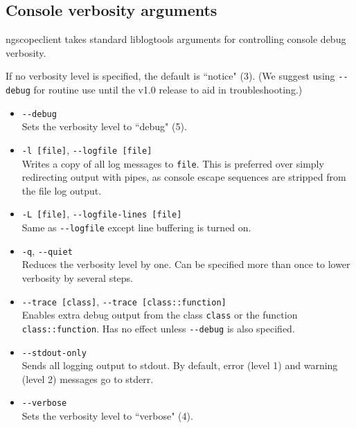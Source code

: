 \subsection{Console verbosity arguments}

ngscopeclient takes standard liblogtools arguments for controlling console debug verbosity.

If no verbosity level is specified, the default is ``notice" (3). (We suggest using \texttt{-{}-debug} for routine use
until the v1.0 release to aid in troubleshooting.)

\begin{itemize}

\item \texttt{-{}-debug}\\
Sets the verbosity level to ``debug" (5).

\item \texttt{-l [file]}, \texttt{-{}-logfile [file]}\\
Writes a copy of all log messages to \texttt{file}. This is preferred over simply redirecting output with pipes, as
console escape sequences are stripped from the file log output.

\item \texttt{-L [file]}, \texttt{-{}-logfile-lines [file]}\\
Same as \texttt{-{}-logfile} except line buffering is turned on.

\item \texttt{-q}, \texttt{-{}-quiet}\\
Reduces the verbosity level by one. Can be specified more than once to lower verbosity by several steps.

\item \texttt{-{}-trace [class]}, \texttt{-{}-trace [class::function]} \\
Enables extra debug output from the class \texttt{class} or the function \texttt{class::function}. Has no effect unless
\texttt{-{}-debug} is also specified.

\item \texttt{-{}-stdout-only}\\
Sends all logging output to stdout. By default, error (level 1) and warning (level 2) messages go to stderr.

\item \texttt{-{}-verbose}\\
Sets the verbosity level to ``verbose" (4).

\end{itemize}

